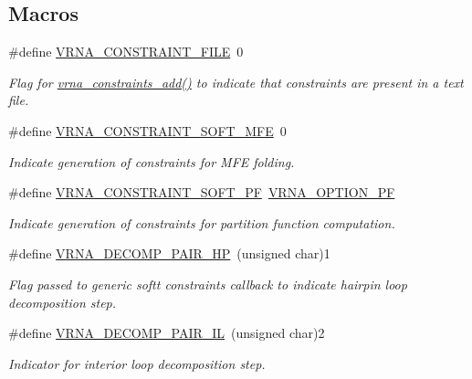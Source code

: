 \subsection*{Macros}
\begin{DoxyCompactItemize}
\item 
\#define \mbox{\hyperlink{group__constraints_ga62e0ed0c33002c09423de4e646f85a2b}{V\+R\+N\+A\+\_\+\+C\+O\+N\+S\+T\+R\+A\+I\+N\+T\+\_\+\+F\+I\+LE}}~0
\begin{DoxyCompactList}\small\item\em Flag for \mbox{\hyperlink{group__constraints_ga35a401f680969a556858a8dd5f1d07cc}{vrna\+\_\+constraints\+\_\+add()}} to indicate that constraints are present in a text file. \end{DoxyCompactList}\item 
\#define \mbox{\hyperlink{group__constraints_ga62aa195893d02d1a79ca94952748df36}{V\+R\+N\+A\+\_\+\+C\+O\+N\+S\+T\+R\+A\+I\+N\+T\+\_\+\+S\+O\+F\+T\+\_\+\+M\+FE}}~0
\begin{DoxyCompactList}\small\item\em Indicate generation of constraints for M\+FE folding. \end{DoxyCompactList}\item 
\#define \mbox{\hyperlink{group__constraints_ga03fb5000c19b9a2082bf4ea30a543045}{V\+R\+N\+A\+\_\+\+C\+O\+N\+S\+T\+R\+A\+I\+N\+T\+\_\+\+S\+O\+F\+T\+\_\+\+PF}}~\mbox{\hyperlink{group__fold__compound_gabfbadcddda3e74ce7f49035ef8f058f7}{V\+R\+N\+A\+\_\+\+O\+P\+T\+I\+O\+N\+\_\+\+PF}}
\begin{DoxyCompactList}\small\item\em Indicate generation of constraints for partition function computation. \end{DoxyCompactList}\item 
\#define \mbox{\hyperlink{group__constraints_ga8bd41ebc8039378d242e4e8c273716a5}{V\+R\+N\+A\+\_\+\+D\+E\+C\+O\+M\+P\+\_\+\+P\+A\+I\+R\+\_\+\+HP}}~(unsigned char)1
\begin{DoxyCompactList}\small\item\em Flag passed to generic softt constraints callback to indicate hairpin loop decomposition step. \end{DoxyCompactList}\item 
\#define \mbox{\hyperlink{group__constraints_gaeab04f34d7730cff2d651d782f95d857}{V\+R\+N\+A\+\_\+\+D\+E\+C\+O\+M\+P\+\_\+\+P\+A\+I\+R\+\_\+\+IL}}~(unsigned char)2
\begin{DoxyCompactList}\small\item\em Indicator for interior loop decomposition step. \end{DoxyCompactList}\item 

\end{DoxyCompactItemize}
